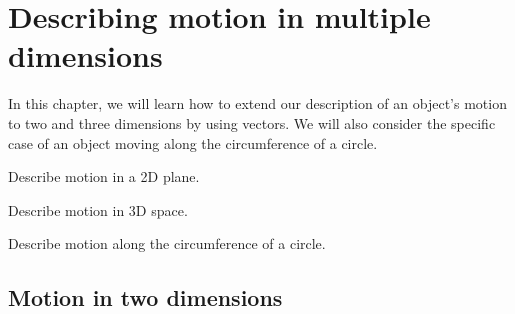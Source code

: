 
\chapter{Describing motion in multiple dimensions}
\label{chapter:describingmotioninnd}
In this chapter, we will learn how to extend our description of an object's motion to two and three dimensions by using vectors. We will also consider the specific case of an object moving along the circumference of a circle. 

\vspace{1cm}
\begin{learningObjectives}
\item Describe motion in a 2D plane.
\item Describe motion in 3D space.
\item Describe motion along the circumference of a circle.
\end{learningObjectives}

\section{Motion in two dimensions}

